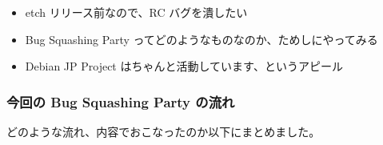 \documentclass[mingoth,a4paper]{jsarticle}
\begin{document}
\begin{itemize}
	\item etch リリース前なので、RC バグを潰したい
	\item Bug Squashing Party ってどのようなものなのか、ためしにやってみる
	\item Debian JP Project はちゃんと活動しています、というアピール
\end{itemize}


\subsubsection{今回の Bug Squashing Party の流れ}

どのような流れ、内容でおこなったのか以下にまとめました。
\end{document}
